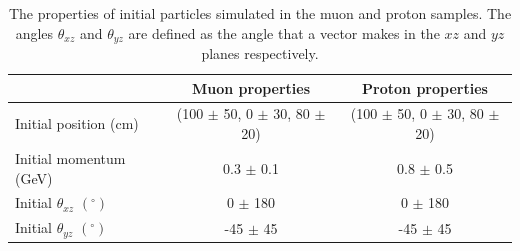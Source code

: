 \begin{table}
\caption{The properties of initial particles simulated in the muon and proton samples. The angles $\theta_{xz}$ and $\theta_{yz}$ are defined as the angle that a vector makes in the $xz$ and $yz$ planes respectively.}
\centering
\label{tab:IsolProp}
\begin{tabular}{l c c}
\toprule
{} & {Muon properties} & {Proton properties} \\ 
\midrule
Initial position (cm)              & (100 $\pm$ 50, 0 $\pm$ 30, 80 $\pm$ 20) & (100 $\pm$ 50, 0 $\pm$ 30, 80 $\pm$ 20)  \\

Initial momentum (GeV)            & 0.3 $\pm$ 0.1 & 0.8 $\pm$ 0.5 \\

Initial $\theta_{xz}$ $(^{\circ})$ &   0 $\pm$ 180 &   0 $\pm$ 180 \\

Initial $\theta_{yz}$ $(^{\circ})$ & -45 $\pm$ 45  & -45 $\pm$ 45  \\
\bottomrule
\end{tabular}
\end{table}

